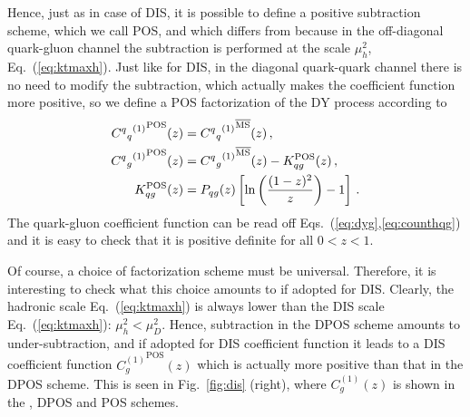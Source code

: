 Hence, just as in case of DIS, it is possible to define a positive
subtraction scheme, which we call POS, and which differs from \msbar{}
because in the off-diagonal quark-gluon channel the
subtraction is performed at the scale $\mu_h^2$,
Eq.~(\ref{eq:ktmaxh}). Just like for DIS, in the diagonal quark-quark
channel there is no need to modify the \msbar{} subtraction, which
actually makes the coefficient function more positive, so we define 
a POS factorization of the DY process according to
\begin{align}\label{eq:counthqq}
 {{C^q{}_q}^{(1)}}^{\textrm{POS}}(z) &=  {{C^q{}_q}^{(1)}}^{{\overline{\textrm{{MS}}}}}(z) \,, \\
 {{C^q{}_g}^{(1)}}^{\textrm{POS}}(z) &=  {{C^q{}_g}^{(1)}}^{{\overline{\textrm{{MS}}}}}(z) - K_{qg}^{\textrm{POS}} (z) \,,\\ \label{eq:counthqg}
  K_{qg}^{\textrm{POS}} (z) &=  P_{qg}(z)\left[\ln\left(\frac{(1-z)^2}{z}\right) - 1\right] \,.
\end{align}
The quark-gluon coefficient function can be read off
Eqs.~(\ref{eq:dyg},\ref{eq:counthqg}) and it is easy to check that it
is positive definite for all $0<z<1$.

Of course, a choice of factorization scheme must be
universal. Therefore, it is interesting to check what this choice
amounts to if adopted for DIS. Clearly, the
hadronic scale Eq.~(\ref{eq:ktmaxh}) is always lower than the DIS
scale Eq.~(\ref{eq:ktmaxh}): $\mu_h^2< \mu_D^2$. Hence, subtraction in the
DPOS scheme amounts to under-subtraction, and if adopted for DIS
coefficient function it leads to a DIS coefficient function
${C^{(1)}_{g}}^{\textrm{POS}}(z)$ which is actually more positive than that
in the DPOS scheme. This is seen in Fig.~\ref{fig:dis} (right), where 
${C^{(1)}_{g}}(z)$ is shown in the \msbar{}, DPOS and POS schemes.

